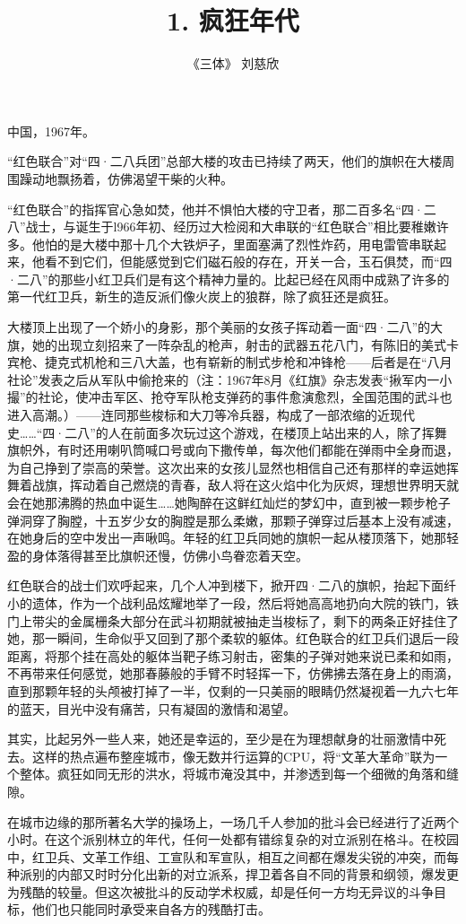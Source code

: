 \documentclass[12pt]{article}
\begin{document}
\title{\textbf{1. 疯狂年代}}
\author{《三体》 \quad \textsf{刘慈欣}}
\maketitle

中国，1967年。

“红色联合”对“四·二八兵团”总部大楼的攻击已持续了两天，他们的旗帜在大楼周围躁动地飘扬着，仿佛渴望干柴的火种。

“红色联合”的指挥官心急如焚，他并不惧怕大楼的守卫者，那二百多名“四·二八”战士，与诞生于l966年初、经历过大检阅和大串联的“红色联合”相比要稚嫩许多。他怕的是大楼中那十几个大铁炉子，里面塞满了烈性炸药，用电雷管串联起来，他看不到它们，但能感觉到它们磁石般的存在，开关一合，玉石俱焚，而“四·二八”的那些小红卫兵们是有这个精神力量的。比起已经在风雨中成熟了许多的第一代红卫兵，新生的造反派们像火炭上的狼群，除了疯狂还是疯狂。

大楼顶上出现了一个娇小的身影，那个美丽的女孩子挥动着一面“四·二八”的大旗，她的出现立刻招来了一阵杂乱的枪声，射击的武器五花八门，有陈旧的美式卡宾枪、捷克式机枪和三八大盖，也有崭新的制式步枪和冲锋枪——后者是在“八月社论”发表之后从军队中偷抢来的（注：1967年8月《红旗》杂志发表“揪军内一小撮”的社论，使冲击军区、抢夺军队枪支弹药的事件愈演愈烈，全国范围的武斗也进入高潮。）——连同那些梭标和大刀等冷兵器，构成了一部浓缩的近现代史……“四·二八”的人在前面多次玩过这个游戏，在楼顶上站出来的人，除了挥舞旗帜外，有时还用喇叭筒喊口号或向下撒传单，每次他们都能在弹雨中全身而退，为自己挣到了崇高的荣誉。这次出来的女孩儿显然也相信自己还有那样的幸运她挥舞着战旗，挥动着自己燃烧的青春，敌人将在这火焰中化为灰烬，理想世界明天就会在她那沸腾的热血中诞生……她陶醉在这鲜红灿烂的梦幻中，直到被一颗步枪子弹洞穿了胸膛，十五岁少女的胸膛是那么柔嫩，那颗子弹穿过后基本上没有减速，在她身后的空中发出一声啾鸣。年轻的红卫兵同她的旗帜一起从楼顶落下，她那轻盈的身体落得甚至比旗帜还慢，仿佛小鸟眷恋着天空。

红色联合的战士们欢呼起来，几个人冲到楼下，掀开四·二八的旗帜，抬起下面纤小的遗体，作为一个战利品炫耀地举了一段，然后将她高高地扔向大院的铁门，铁门上带尖的金属栅条大部分在武斗初期就被抽走当梭标了，剩下的两条正好挂住了她，那一瞬间，生命似乎又回到了那个柔软的躯体。红色联合的红卫兵们退后一段距离，将那个挂在高处的躯体当靶子练习射击，密集的子弹对她来说已柔和如雨，不再带来任何感觉，她那春藤般的手臂不时轻挥一下，仿佛拂去落在身上的雨滴，直到那颗年轻的头颅被打掉了一半，仅剩的一只美丽的眼睛仍然凝视着一九六七年的蓝天，目光中没有痛苦，只有凝固的激情和渴望。

其实，比起另外一些人来，她还是幸运的，至少是在为理想献身的壮丽激情中死去。这样的热点遍布整座城市，像无数并行运算的CPU，将“文革大革命”联为一个整体。疯狂如同无形的洪水，将城市淹没其中，并渗透到每一个细微的角落和缝隙。

在城市边缘的那所著名大学的操场上，一场几千人参加的批斗会已经进行了近两个小时。在这个派别林立的年代，任何一处都有错综复杂的对立派别在格斗。在校园中，红卫兵、文革工作组、工宣队和军宣队，相互之间都在爆发尖锐的冲突，而每种派别的内部又时时分化出新的对立派系，捍卫着各自不同的背景和纲领，爆发更为残酷的较量。但这次被批斗的反动学术权威，却是任何一方均无异议的斗争目标，他们也只能同时承受来自各方的残酷打击。
\end{document}
